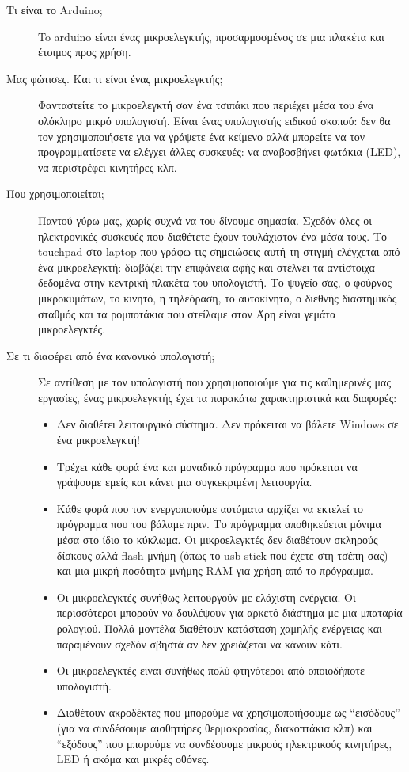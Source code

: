 \documentclass[a4paper,twoside,12pt]{article}
\begin{document}
\begin{description}

\item [Τι είναι το Arduino;]
To arduino είναι ένας μικροελεγκτής, προσαρμοσμένος σε μια πλακέτα και έτοιμος προς χρήση.
%
\item[Μας φώτισες. Και τι είναι ένας μικροελεγκτής;]
Φανταστείτε το μικροελεγκτή σαν ένα τσιπάκι που περιέχει μέσα του ένα ολόκληρο μικρό υπολογιστή. Είναι ένας υπολογιστής ειδικού σκοπού: δεν θα τον χρησιμοποιήσετε για να γράψετε ένα κείμενο αλλά μπορείτε να τον προγραμματίσετε να ελέγχει άλλες συσκευές: να αναβοσβήνει φωτάκια (LED), να περιστρέφει κινητήρες κλπ.
%
\item[Που χρησιμοποιείται;]
Παντού γύρω μας, χωρίς συχνά να του δίνουμε σημασία. Σχεδόν όλες οι ηλεκτρονικές συσκευές που διαθέτετε έχουν τουλάχιστον ένα μέσα τους. Το touchpad στο laptop που γράφω τις σημειώσεις αυτή τη στιγμή ελέγχεται από ένα μικροελεγκτή: διαβάζει την επιφάνεια αφής και στέλνει τα αντίστοιχα δεδομένα στην κεντρική πλακέτα του υπολογιστή. Το ψυγείο σας, ο φούρνος μικροκυμάτων, το κινητό, η τηλεόραση, το αυτοκίνητο, ο διεθνής διαστημικός σταθμός και τα ρομποτάκια που στείλαμε στον Άρη είναι γεμάτα μικροελεγκτές.
%
\item[Σε τι διαφέρει από ένα κανονικό υπολογιστή;]
Σε αντίθεση με τον υπολογιστή που χρησιμοποιούμε για τις καθημερινές μας εργασίες, ένας μικροελεγκτής έχει τα παρακάτω χαρακτηριστικά και διαφορές:
%
\begin{itemize}
\item Δεν διαθέτει λειτουργικό σύστημα. Δεν πρόκειται να βάλετε Windows σε ένα μικροελεγκτή!
\item Τρέχει κάθε φορά ένα και μοναδικό πρόγραμμα που πρόκειται να γράψουμε εμείς και κάνει μια συγκεκριμένη λειτουργία.
\item Κάθε φορά που τον ενεργοποιούμε αυτόματα αρχίζει να εκτελεί το πρόγραμμα που του βάλαμε πριν. Το πρόγραμμα αποθηκεύεται μόνιμα μέσα στο ίδιο το κύκλωμα. Οι μικροελεγκτές δεν διαθέτουν σκληρούς δίσκους αλλά flash μνήμη (όπως το usb stick που έχετε στη τσέπη σας) και μια μικρή ποσότητα μνήμης RAM για χρήση από το πρόγραμμα.
\item Οι μικροελεγκτές συνήθως λειτουργούν με ελάχιστη ενέργεια. Οι περισσότεροι μπορούν να δουλέψουν για αρκετό διάστημα με μια μπαταρία ρολογιού. Πολλά μοντέλα διαθέτουν κατάσταση χαμηλής ενέργειας και παραμένουν σχεδόν σβηστά αν δεν χρειάζεται να κάνουν κάτι.
\item Οι μικροελεγκτές είναι συνήθως πολύ φτηνότεροι από οποιοδήποτε υπολογιστή.
\item Διαθέτουν ακροδέκτες που μπορούμε να χρησιμοποιήσουμε ως ``εισόδους'' (για να συνδέσουμε αισθητήρες θερμοκρασίας, διακοπτάκια κλπ) και ``εξόδους'' που μπορούμε να συνδέσουμε μικρούς ηλεκτρικούς κινητήρες, LED ή ακόμα και μικρές οθόνες.
\end{itemize}


\end{description}
\end{document}
